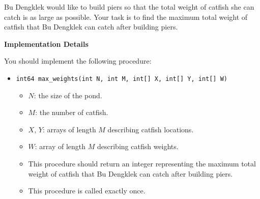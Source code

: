 Bu Dengklek would like to build piers so that the total weight of catfish she can catch is as large as possible.
Your task is to find the maximum total weight of catfish that Bu Dengklek can catch after building piers.


\textbf{Implementation Details}

You should implement the following procedure:
\begin{itemize}
    \item \texttt{int64 max\_weights(int N, int M, int[] X, int[] Y, int[] W)}
    \begin{itemize}
        \item $N$: the size of the pond.
        \item  $M$: the number of catfish.
        \item  $X$, $Y$: arrays of length $M$ describing catfish locations.
        \item  $W$: array of length $M$ describing catfish weights.
        \item  This procedure should return an integer representing the maximum total weight of catfish that Bu Dengklek can catch after building piers.
        \item  This procedure is called exactly once.
\end{itemize}
\end{itemize}


